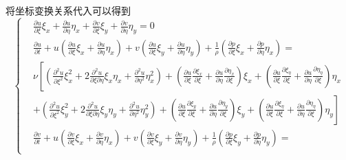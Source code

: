 \documentclass[12pt]{article}
\begin{document}
将坐标变换关系代入可以得到
\begin{equation}
	\left\{\begin{aligned}
		 & \frac{\partial u}{\partial \xi} \xi_{x}+\frac{\partial u}{\partial \eta} \eta_{x}+\frac{\partial v}{\partial \xi} \xi_{y}+\frac{\partial v}{\partial \eta} \eta_{y}=0                                                                                                                                                                                                                                                                                                                                                                                    \\
		 & \frac{\partial u}{\partial t}+u\left(\frac{\partial u}{\partial \xi} \xi_{x}+\frac{\partial u}{\partial \eta} \eta_{x}\right)+v\left(\frac{\partial u}{\partial \xi} \xi_{y}+\frac{\partial u}{\partial \eta} \eta_{y}\right)+\frac{1}{\rho}\left(\frac{\partial p}{\partial \xi} \xi_{x}+\frac{\partial p}{\partial \eta} \eta_{x}\right)=                                                                                                                                                                                                              \\
		 & \nu\left[\left(\frac{\partial^{2} u}{\partial \xi^{2}} \xi_{x}^{2}+2 \frac{\partial^{2} u}{\partial \xi \partial \eta} \xi_{x} \eta_{x}+\frac{\partial^{2} u}{\partial \eta^{2}} \eta_{x}^{2}\right)+\left(\frac{\partial u}{\partial \xi} \frac{\partial \xi_{x}}{\partial \xi}+\frac{\partial u}{\partial \eta} \frac{\partial \eta_{x}}{\partial \xi}\right) \xi_{x}+\left(\frac{\partial u}{\partial \xi} \frac{\partial \xi_{\eta}}{\partial \xi}+\frac{\partial u}{\partial \eta} \frac{\partial \eta_{\eta}}{\partial \xi}\right) \eta_{x}\right. \\
		 & \left.+\left(\frac{\partial^{2} u}{\partial \xi^{2}} \xi_{y}^{2}+2 \frac{\partial^{2} u}{\partial \xi \partial \eta} \xi_{y} \eta_{y}+\frac{\partial^{2} u}{\partial \eta^{2}} \eta_{y}^{2}\right)+\left(\frac{\partial u}{\partial \xi} \frac{\partial \xi_{y}}{\partial \xi}+\frac{\partial u}{\partial \eta} \frac{\partial \eta_{y}}{\partial \xi}\right) \xi_{y}+\left(\frac{\partial u}{\partial \xi} \frac{\partial \xi_{\eta}}{\partial \xi}+\frac{\partial u}{\partial \eta} \frac{\partial \eta_{\eta}}{\partial \xi}\right) \eta_{y}\right]   \\
		 & \frac{\partial v}{\partial t}+u\left(\frac{\partial v}{\partial \xi} \xi_{x}+\frac{\partial v}{\partial \eta} \eta_{x}\right)+v\left(\frac{\partial v}{\partial \xi} \xi_{y}+\frac{\partial v}{\partial \eta} \eta_{y}\right)+\frac{1}{\rho}\left(\frac{\partial p}{\partial \xi} \xi_{y}+\frac{\partial p}{\partial \eta} \eta_{y}\right)=                                                                                                                                                                                                              \\

\end{aligned}
\end{equation}
\end{document}
